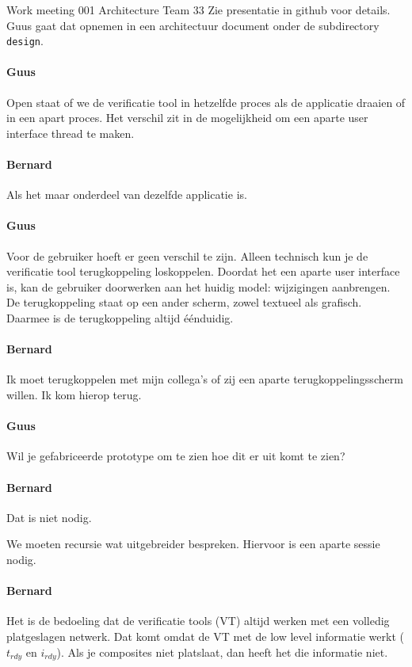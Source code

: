 \documentclass[a4paper,final]{article}
\begin{document}
\begin{Minutes}{Work meeting 001 Architecture Team 33}
Zie presentatie in github voor details. Guus gaat dat opnemen in een architectuur document 
onder de subdirectory \texttt{design}.

\paragraph{Guus} Open staat of we de verificatie tool in hetzelfde proces als de applicatie draaien
of in een apart proces. Het verschil zit in de mogelijkheid om een aparte user interface thread
te maken.

\paragraph{Bernard} Als het maar onderdeel van dezelfde applicatie is.

\paragraph{Guus} Voor de gebruiker hoeft er geen verschil te zijn. Alleen technisch
kun je de verificatie tool terugkoppeling loskoppelen. Doordat het een aparte user
interface is, kan de gebruiker doorwerken aan het huidig model: wijzigingen aanbrengen.
De terugkoppeling staat op een ander scherm, zowel textueel als grafisch. Daarmee is de terugkoppeling
altijd \'{e}\'{e}nduidig.

\paragraph{Bernard} Ik moet terugkoppelen met mijn collega's of zij 
een aparte terugkoppelingsscherm willen. Ik kom hierop terug.

\paragraph{Guus} Wil je gefabriceerde prototype om te zien hoe dit er uit komt te zien?

\paragraph{Bernard} Dat is niet nodig.

 We moeten recursie wat uitgebreider bespreken. Hiervoor is een aparte 
sessie nodig.


\paragraph{Bernard} Het is de bedoeling dat de verificatie tools (VT) altijd werken met een 
volledig platgeslagen netwerk. Dat komt omdat de VT met de low level informatie werkt
($t_{rdy}$ en $i_{rdy}$). Als je composites niet platslaat, dan heeft het die informatie niet.


\end{Minutes}
\end{document}
